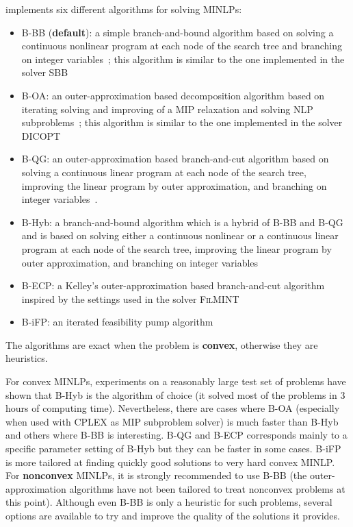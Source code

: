 \BONMIN implements six different algorithms for solving MINLPs:
\begin{itemize}
\setlength{\partopsep}{0pt}
\setlength{\itemsep}{0pt}
\item {B-BB} (\textbf{default}): a simple branch-and-bound algorithm based on solving a continuous nonlinear program at each node of the search tree and branching on integer variables~\cite{GuptaRavindran85}; this algorithm is similar to the one implemented in the solver \textsc{SBB}
\item {B-OA}: an outer-approximation based decomposition algorithm based on iterating solving and improving of a MIP relaxation and solving NLP subproblems~\cite{DuGr86,FlLe94}; this algorithm is similar to the one implemented in the solver \textsc{DICOPT}
\item {B-QG}: an outer-approximation based branch-and-cut algorithm based on solving a continuous linear program at each node of the search tree, improving the linear program by outer approximation, and branching on integer variables~\cite{QeGr92}.
\item {B-Hyb}: a branch-and-bound algorithm which is a hybrid of B-BB and B-QG and is based on solving either a continuous nonlinear or a continuous linear program at each node of the search tree, improving the linear program by outer approximation, and branching on integer variables~\cite{BBCCGLLLMSW}
\item {B-ECP}: a Kelley's outer-approximation based branch-and-cut algorithm inspired by the settings used in the solver \textsc{FilMINT}~\cite{AbLeLi07}
\item {B-iFP}: an iterated feasibility pump algorithm~\cite{BoCoLoMa06}
\end{itemize}
The algorithms are exact when the problem is \textbf{convex}, otherwise they are heuristics.

For convex MINLPs, experiments on a reasonably large test set of problems have shown that B-Hyb is the algorithm of choice (it solved most of the problems in 3 hours of computing time).
Nevertheless, there are cases where B-OA (especially when used with CPLEX as MIP subproblem solver) is much faster than B-Hyb and others where B-BB is interesting.
B-QG and B-ECP corresponds mainly to a specific parameter setting of B-Hyb but they can be faster in some cases.
B-iFP is more tailored at finding quickly good solutions to very hard convex MINLP.
For \textbf{nonconvex} MINLPs, it is strongly recommended to use B-BB (the outer-approximation algorithms have not been tailored to treat nonconvex problems at this point).
Although even B-BB is only a heuristic for such problems, several options are available to try and improve the quality of the solutions it provides.

